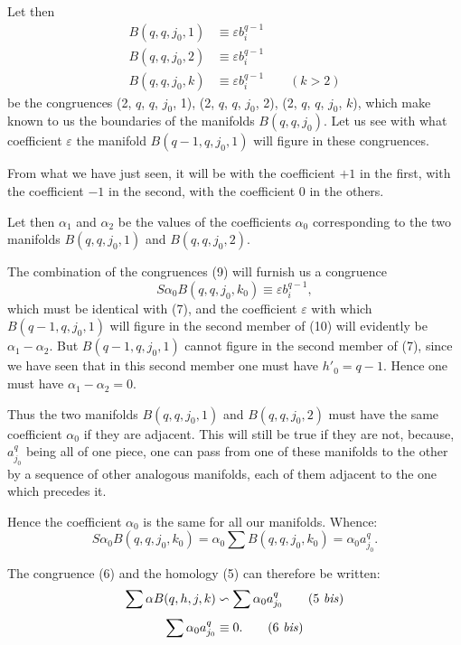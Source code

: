 \documentclass{article}
\begin{document}
Let then
\[ \begin{aligned} B(q, q, j_{0}, 1) &\equiv \varepsilon b^{q-1}_{i} \\ B(q, q, j_{0}, 2) &\equiv \varepsilon b^{q-1}_{i} \\ B(q, q, j_{0}, k) &\equiv \varepsilon b^{q-1}_{i} \qquad (k > 2) \end{aligned} \tag{9} \]
be the congruences (2, $q$, $q$, $j_{0}$, 1), (2, $q$, $q$, $j_{0}$, 2), (2, $q$, $q$, $j_{0}$, $k$), which make known to us the boundaries of the manifolds $B(q, q, j_{0})$. Let us see with what coefficient $\varepsilon$ the manifold $B(q - 1, q, j_{0}, 1)$ will figure in these congruences.

From what we have just seen, it will be with the coefficient $+1$ in the first, with the coefficient $-1$ in the second, with the coefficient 0 in the others.

Let then $\alpha_{1}$ and $\alpha_{2}$ be the values of the coefficients $\alpha_{0}$ corresponding to the two manifolds $B(q, q, j_{0}, 1)$ and $B(q, q, j_{0}, 2)$.

The combination of the congruences (9) will furnish us a congruence
\[ S \alpha_{0} B(q, q, j_{0}, k_{0}) \equiv \varepsilon b^{q-1}_{i}, \tag{10} \]
which must be identical with (7), and the coefficient $\varepsilon$ with which $B(q - 1, q, j_{0}, 1)$ will figure in the second member of (10) will evidently be $\alpha_{1} - \alpha_{2}$. But $B(q - 1, q, j_{0}, 1)$ cannot figure in the second member of (7), since we have seen that in this second member one must have $h'_{0} = q - 1$. Hence one must have $\alpha_{1} - \alpha_{2} = 0$.

Thus the two manifolds $B(q, q, j_{0}, 1)$ and $B(q, q, j_{0}, 2)$ must have the same coefficient $\alpha_{0}$ if they are adjacent. This will still be true if they are not, because, $a^{q}_{j_{0}}$ being all of one piece, one can pass from one of these manifolds to the other by a sequence of other analogous manifolds, each of them adjacent to the one which precedes it.

Hence the coefficient $\alpha_{0}$ is the same for all our manifolds. Whence:
\[ S \alpha_{0} B(q, q, j_{0}, k_{0}) = \alpha_{0} \sum B(q, q, j_{0}, k_{0}) = \alpha_{0} a^{q}_{j_{0}}. \]

The congruence (6) and the homology (5) can therefore be written:
\[ \sum \alpha B(q, h, j, k) \backsim \sum \alpha_{0} a^{q}_{j_{0}} \tag{5 \textit{bis}} \]
\[ \sum \alpha_{0} a^{q}_{j_{0}} \equiv 0. \tag{6 \textit{bis}} \]
\end{document}
